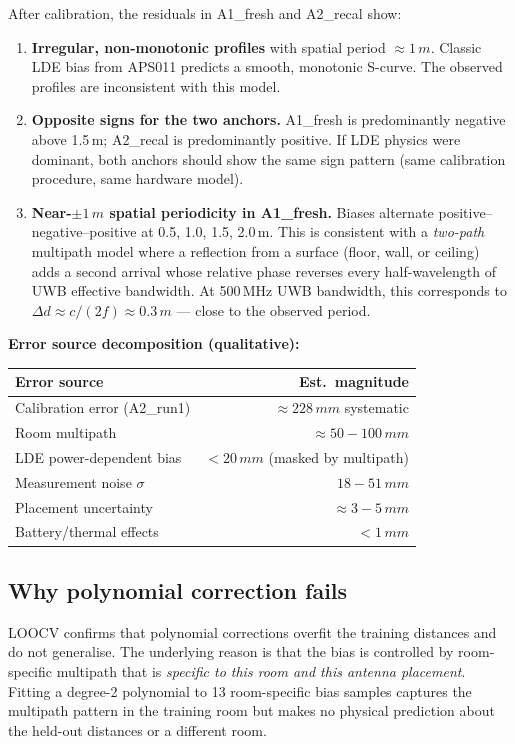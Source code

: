 \documentclass[10pt,a4paper,twocolumn]{article}
\begin{document}
After calibration, the residuals in A1\_fresh and A2\_recal show:
\begin{enumerate}[noitemsep]
\item \textbf{Irregular, non-monotonic profiles} with spatial period
  $\approx 1\,m$.  Classic LDE bias from APS011 predicts a smooth,
  monotonic S-curve.  The observed profiles are inconsistent with this model.
\item \textbf{Opposite signs for the two anchors.}  A1\_fresh is predominantly
  negative above 1.5\,m; A2\_recal is predominantly positive.  If LDE
  physics were dominant, both anchors should show the same sign pattern (same
  calibration procedure, same hardware model).
\item \textbf{Near-$\pm1\,m$ spatial periodicity in A1\_fresh.}  Biases
  alternate positive--negative--positive at 0.5, 1.0, 1.5, 2.0\,m.  This is
  consistent with a \emph{two-path} multipath model where a reflection from a
  surface (floor, wall, or ceiling) adds a second arrival whose relative phase
  reverses every half-wavelength of UWB effective bandwidth.  At
  500\,MHz UWB bandwidth, this corresponds to $\Delta d \approx
  c/(2f) \approx 0.3\,m$ --- close to the observed period.
\end{enumerate}

\textbf{Error source decomposition (qualitative):}

\begin{center}
\begin{tabular}{lr}
\toprule
Error source & Est.\ magnitude \\
\midrule
Calibration error (A2\_run1) & $\approx 228\,mm$ systematic \\
Room multipath & $\approx 50-100\,mm$ \\
LDE power-dependent bias & $< 20\,mm$ (masked by multipath) \\
Measurement noise $\sigma$ & $18-51\,mm$ \\
Placement uncertainty & $\approx 3-5\,mm$ \\
Battery/thermal effects & $< 1\,mm$ \\
\bottomrule
\end{tabular}
\end{center}

\subsection{Why polynomial correction fails}

LOOCV confirms that polynomial corrections overfit the training distances and
do not generalise.  The underlying reason is that the bias is controlled by
room-specific multipath that is \emph{specific to this room and this antenna
placement}.  Fitting a degree-2 polynomial to 13 room-specific bias samples
captures the multipath pattern in the training room but makes no physical
prediction about the held-out distances or a different room.
\end{document}
